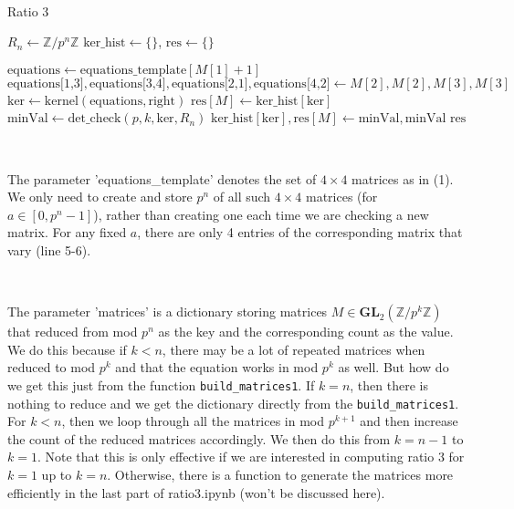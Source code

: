 \documentclass[letterpaper,12pt]{article}
\newcommand{\Z}{\mathbb{Z}}
\newcommand{\GL}{\mathbf {GL}}
\begin{document}
\

\begin{algorithm}[H]
\caption{Ratio 3}
\begin{algorithmic}[1]
\State $R_n \gets \Z/p^n\Z$
\State $\text{ker\_hist} \gets \{\}$,  $\text{res} \gets \{\}$ 

    \State $\text{equations} \gets \text{equations\_template}[M[1]+1]$
    \State $\text{equations[1,3]}, \text{equations[3,4]}, \text{equations[2,1]}, \text{equations[4,2]}\gets M[2], M[2], M[3], M[3]$
    \State $\text{ker} \gets \mathrm{kernel}(\text{equations}, \text{right})$
        \State $\text{res}[M] \gets \text{ker\_hist}[\text{ker}]$
    \Else
        \State $\text{minVal} \gets \mathrm{det\_check}(p, k, \text{ker}, R_n)$
        \State $\text{ker\_hist}[\text{ker}],\text{res}[M] \gets \text{minVal}, \text{minVal}$
    \EndIf
\EndFor
\State \Return $\text{res}$
\EndFunction
\end{algorithmic}
\end{algorithm}


\

The parameter 'equations\_template' denotes the set of $4\times4$ matrices as in (1).
We only need to create and store $p^n$ of all such $4 \times 4$ matrices (for $a \in [0, p^n-1]$),
rather than creating one each time we are checking a new matrix.
For any fixed $a$, there are only 4 entries of the corresponding matrix
that vary (line 5-6).

\

The parameter 'matrices' is a dictionary storing matrices $M \in \GL_2(\Z/p^k\Z)$ that 
reduced from mod $p^n$ as the key and the corresponding count as the value.
We do this because if $k < n$, there may be a lot of repeated matrices
when reduced to mod $p^k$ and that the equation works in mod $p^k$ as well.
But how do we get this just from the function \texttt{build\_matrices1}.
If $k = n$, then there is nothing to reduce and we get the dictionary directly from the \texttt{build\_matrices1}.
For $k<n$, then we loop through all the matrices in mod $p^{k+1}$ 
and then increase the count of the reduced matrices accordingly.
We then do this from $k = n-1$ to $k = 1$.
Note that this is only effective if we are interested in computing ratio 3
for $k =1$ up to $k = n$. 
Otherwise, there is a function to generate the matrices more efficiently 
in the last part of ratio3.ipynb (won't be discussed here).
\end{document}
